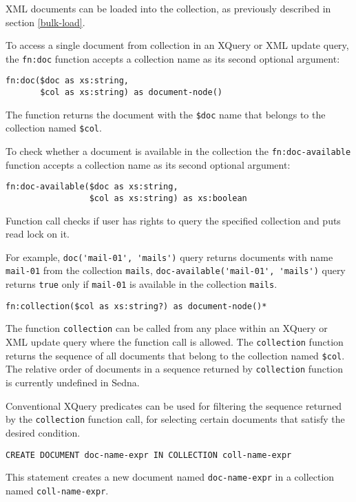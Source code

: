\documentclass[a4paper,12pt]{article}
\begin{document}
XML documents can be loaded into the collection, as previously described in
section \ref{bulk-load}.

To access a single document from collection in an XQuery or XML update query,
the \verb!fn:doc! function accepts a collection name as its second optional
argument:
\begin{verbatim}
fn:doc($doc as xs:string,
       $col as xs:string) as document-node()
\end{verbatim}
The function returns the document with the \verb!$doc! name that belongs to the
collection named \verb!$col!.

To check whether a document is available in the collection the
\verb!fn:doc-available! function accepts a collection name as its second
optional argument:
\begin{verbatim}
fn:doc-available($doc as xs:string,
                 $col as xs:string) as xs:boolean
\end{verbatim}
Function call checks if user has rights to query the specified collection and
puts read lock on it.

For example, \verb!doc('mail-01', 'mails')! query returns documents with name
\verb!mail-01! from the collection \verb!mails!,
\verb!doc-available('mail-01', 'mails')! query returns \verb!true! only if
\verb!mail-01! is available in the collection \verb!mails!.

\begin{verbatim}
fn:collection($col as xs:string?) as document-node()*
\end{verbatim}
The function \verb!collection! can be called from any place within an XQuery or
XML update query where the function call is allowed. The \verb!collection!
function returns the sequence of all documents that belong to the collection
named \verb!$col!. The relative order of documents in a sequence returned by
\verb!collection! function is currently undefined in Sedna.

Conventional XQuery predicates can be used for filtering the sequence returned
by the \verb!collection! function call, for selecting certain documents that
satisfy the desired condition.

\begin{verbatim}
CREATE DOCUMENT doc-name-expr IN COLLECTION coll-name-expr
\end{verbatim}

This statement creates a new document named \verb!doc-name-expr! in a collection
named \verb!coll-name-expr!.
\end{document}
